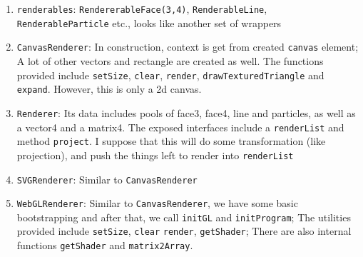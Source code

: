 \documentclass[]{article}
\begin{document}
\begin{enumerate}
  \begin{enumerate}
  \def\labelenumii{\arabic{enumii}.}
  \itemsep1pt\parskip0pt
  \item
    \texttt{renderables}: \texttt{RendererableFace(3,4)},
    \texttt{RenderableLine}, \texttt{RenderableParticle} etc., looks
    like another set of wrappers
  \item
    \texttt{CanvasRenderer}: In construction, context is get from
    created \texttt{canvas} element; A lot of other vectors and
    rectangle are created as well. The functions provided include
    \texttt{setSize}, \texttt{clear}, \texttt{render},
    \texttt{drawTexturedTriangle} and \texttt{expand}. However, this is
    only a 2d canvas.
  \item
    \texttt{Renderer}: Its data includes pools of face3, face4, line and
    particles, as well as a vector4 and a matrix4. The exposed
    interfaces include a \texttt{renderList} and method
    \texttt{project}. I suppose that this will do some transformation
    (like projection), and push the things left to render into
    \texttt{renderList}
  \item
    \texttt{SVGRenderer}: Similar to \texttt{CanvasRenderer}
  \item
    \texttt{WebGLRenderer}: Similar to \texttt{CanvasRenderer}, we have
    some basic bootstrapping and after that, we call \texttt{initGL} and
    \texttt{initProgram}; The utilities provided include
    \texttt{setSize}, \texttt{clear} \texttt{render},
    \texttt{getShader}; There are also internal functions
    \texttt{getShader} and \texttt{matrix2Array}.


\end{enumerate}
\end{enumerate}
\end{document}
